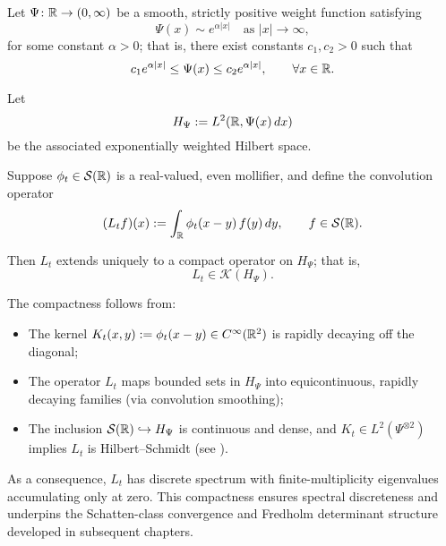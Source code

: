 \begin{proposition}[Compactness of \( L_t \)]
\label{prop:compactness_Lt}
Let \( \Psi \colon \mathbb{R} \to (0,\infty) \) be a smooth, strictly positive weight function satisfying
\[
\Psi(x) \sim e^{\alpha|x|} \quad \text{as } |x| \to \infty,
\]
for some constant \( \alpha > 0 \); that is, there exist constants \( c_1, c_2 > 0 \) such that
\[
c_1 e^{\alpha |x|} \le \Psi(x) \le c_2 e^{\alpha |x|}, \qquad \forall x \in \mathbb{R}.
\]

Let
\[
H_\Psi := L^2(\mathbb{R}, \Psi(x)\, dx)
\]
be the associated exponentially weighted Hilbert space.

Suppose \( \phi_t \in \mathcal{S}(\mathbb{R}) \) is a real-valued, even mollifier, and define the convolution operator
\[
(L_t f)(x) := \int_{\mathbb{R}} \phi_t(x - y)\, f(y)\, dy, \qquad f \in \mathcal{S}(\mathbb{R}).
\]

Then \( L_t \) extends uniquely to a compact operator on \( H_\Psi \); that is,
\[
L_t \in \mathcal{K}(H_\Psi).
\]

\medskip
\noindent
The compactness follows from:
\begin{itemize}
    \item The kernel \( K_t(x,y) := \phi_t(x - y) \in C^\infty(\mathbb{R}^2) \) is rapidly decaying off the diagonal;
    \item The operator \( L_t \) maps bounded sets in \( H_\Psi \) into equicontinuous, rapidly decaying families (via convolution smoothing);
    \item The inclusion \( \mathcal{S}(\mathbb{R}) \hookrightarrow H_\Psi \) is continuous and dense, and \( K_t \in L^2(\Psi^{\otimes 2}) \) implies \( L_t \) is Hilbert--Schmidt (see ).
\end{itemize}

\medskip
\noindent
As a consequence, \( L_t \) has discrete spectrum with finite-multiplicity eigenvalues accumulating only at zero. This compactness ensures spectral discreteness and underpins the Schatten-class convergence and Fredholm determinant structure developed in subsequent chapters.
\end{proposition}
